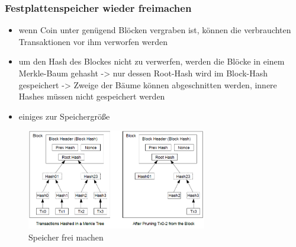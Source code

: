 \subsubsection*{Festplattenspeicher wieder freimachen}
    \begin{itemize}
        \item wenn Coin unter genügend Blöcken vergraben ist, können die verbrauchten Transaktionen vor ihm verworfen werden
        \item um den Hash des Blockes nicht zu verwerfen, werden die Blöcke in einem Merkle-Baum gehasht -> nur dessen Root-Hash wird im Block-Hash gespeichert -> Zweige der Bäume können abgeschnitten werden, innere Hashes müssen nicht gespeichert werden
        \item einiges zur Speichergröße
    \end{itemize}
    \begin{figure}[H]
        \centering
        \includegraphics[width=0.7\textwidth]{paperNotes/bitcoin04.PNG}
        \caption{Speicher frei machen}
        \label{figure:prune}
    \end{figure}

